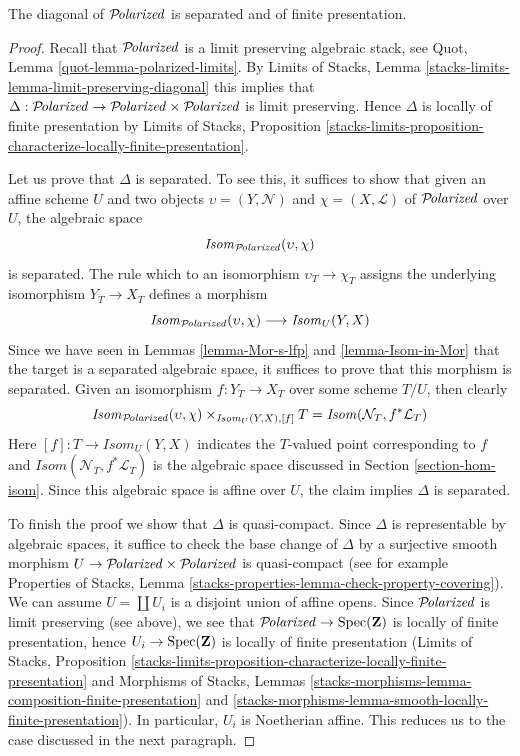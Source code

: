 \begin{lemma}
\label{lemma-polarized-diagonal-separated-fp}
The diagonal of $\mathcal{P}\!\mathit{olarized}$ is separated
and of finite presentation.
\end{lemma}

\begin{proof}
Recall that $\mathcal{P}\!\mathit{olarized}$ is a limit preserving algebraic stack, see
Quot, Lemma \ref{quot-lemma-polarized-limits}.
By Limits of Stacks, Lemma \ref{stacks-limits-lemma-limit-preserving-diagonal}
this implies that
$\Delta : \mathcal{P}\!\mathit{olarized} \to \mathcal{P}\!\mathit{olarized} \times \mathcal{P}\!\mathit{olarized}$
is limit preserving. Hence $\Delta$ is locally of finite presentation
by Limits of Stacks, Proposition
\ref{stacks-limits-proposition-characterize-locally-finite-presentation}.

\medskip\noindent
Let us prove that $\Delta$ is separated. To see this, it suffices to show
that given an affine scheme $U$ and two objects
$\upsilon = (Y, \mathcal{N})$ and $\chi = (X, \mathcal{L})$
of $\mathcal{P}\!\mathit{olarized}$ over $U$, the algebraic
space
$$
\mathit{Isom}_{\mathcal{P}\!\mathit{olarized}}(\upsilon, \chi)
$$
is separated. The rule which to an isomorphism $\upsilon_T \to \chi_T$
assigns the underlying isomorphism $Y_T \to X_T$ defines a morphism
$$
\mathit{Isom}_{\mathcal{P}\!\mathit{olarized}}(\upsilon, \chi)
\longrightarrow
\mathit{Isom}_U(Y, X)
$$
Since we have seen in Lemmas \ref{lemma-Mor-s-lfp} and
\ref{lemma-Isom-in-Mor} that the target is
a separated algebraic space, it suffices to prove that this morphism
is separated. Given an isomorphism $f : Y_T \to X_T$
over some scheme $T/U$, then clearly
$$
\mathit{Isom}_{\mathcal{P}\!\mathit{olarized}}(\upsilon, \chi)
\times_{\mathit{Isom}_U(Y, X), [f]} T
=
\mathit{Isom}(\mathcal{N}_T, f^*\mathcal{L}_T)
$$
Here $[f] : T \to \mathit{Isom}_U(Y, X)$ indicates the $T$-valued
point corresponding to $f$ and
$\mathit{Isom}(\mathcal{N}_T, f^*\mathcal{L}_T)$
is the algebraic space discussed in Section \ref{section-hom-isom}.
Since this algebraic space is affine over $U$, the claim implies
$\Delta$ is separated.

\medskip\noindent
To finish the proof we show that $\Delta$ is quasi-compact. Since
$\Delta$ is representable by algebraic spaces, it suffice to check
the base change of $\Delta$ by a surjective smooth morphism
$U \to \mathcal{P}\!\mathit{olarized} \times \mathcal{P}\!\mathit{olarized}$ is quasi-compact
(see for example Properties of Stacks, Lemma
\ref{stacks-properties-lemma-check-property-covering}).
We can assume $U = \coprod U_i$ is a disjoint union of affine opens.
Since $\mathcal{P}\!\mathit{olarized}$ is limit preserving (see above), we
see that $\mathcal{P}\!\mathit{olarized} \to \mathop{\mathrm{Spec}}(\mathbf{Z})$ is locally of
finite presentation, hence $U_i \to \mathop{\mathrm{Spec}}(\mathbf{Z})$ is
locally of finite presentation
(Limits of Stacks, Proposition
\ref{stacks-limits-proposition-characterize-locally-finite-presentation}
and Morphisms of Stacks, Lemmas
\ref{stacks-morphisms-lemma-composition-finite-presentation} and
\ref{stacks-morphisms-lemma-smooth-locally-finite-presentation}).
In particular, $U_i$ is Noetherian affine. This reduces us to the
case discussed in the next paragraph.


\end{proof}
